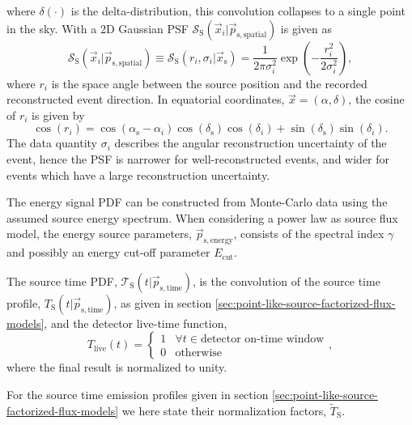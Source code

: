\documentclass{article}
\newcommand{\xs}{\vec{x}_{\mathrm{s}}}
\begin{document}
where $\delta(\cdot)$ is the delta-distribution, this convolution collapses to
a single point in the sky. With a 2D Gaussian PSF
$\mathcal{S}_{\mathrm{S}}(\vec{x}_i|\vec{p}_{\mathrm{s,spatial}})$ is given as
\begin{equation}
 \mathcal{S}_{\mathrm{S}}(\vec{x}_i|\vec{p}_{\mathrm{s,spatial}}) \equiv \mathcal{S}_{\mathrm{S}}(r_i,\sigma_i|\xs) = \frac{1}{2\pi\sigma_i^2}\exp\left({-\frac{r_i^2}{2\sigma_i^2}}\right),
\end{equation}
where $r_i$ is the space angle between the source position and the recorded
reconstructed event direction. In equatorial coordinates,
$\vec{x} = (\alpha,\delta)$, the cosine of $r_i$ is given by
\begin{equation}
 \cos(r_i) = \cos(\alpha_{\mathrm{s}} - \alpha_i) \cos(\delta_{\mathrm{s}})\cos({\delta_i}) + \sin(\delta_{\mathrm{s}})\sin(\delta_i).
\end{equation}
The data quantity $\sigma_i$ describes the angular reconstruction uncertainty of
the event, hence the PSF is narrower for well-reconstructed events, and wider
for events which have a large reconstruction uncertainty.

The energy signal PDF can be constructed from Monte-Carlo data using the assumed
source energy spectrum.
When considering a power law as source flux model, the energy source parameters,
$\vec{p}_{\mathrm{s,energy}}$, consists of the spectral index $\gamma$ and possibly
an energy cut-off parameter $E_{\mathrm{cut}}$.

The source time PDF, $\mathcal{T}_{\mathrm{S}}(t|\vec{p}_{\mathrm{s},\mathrm{time}})$,
is the convolution of the source time profile,
$T_{\mathrm{S}}(t|\vec{p}_{\mathrm{s},\mathrm{time}})$, as given in section
\ref{sec:point-like-source-factorized-flux-models}, and the detector live-time function,
\begin{equation}
 T_{\mathrm{live}}(t) = \begin{cases}
                         1 & \forall t \in \text{detector on-time window} \\
                         0 & \text{otherwise}
                        \end{cases},
 \label{eq:Tlive}
\end{equation}
where the final result is normalized to unity.

For the source time emission profiles given in section
\ref{sec:point-like-source-factorized-flux-models} we here state their
normalization factors, $\tilde{T}_{\mathrm{S}}$.
\end{document}
